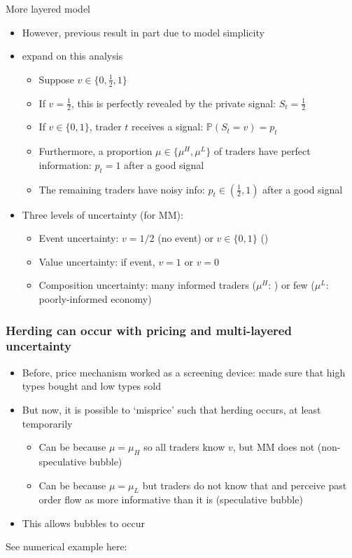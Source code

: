 \documentclass[english,10pt
,aspectratio=169
]{beamer}
\begin{document}
\begin{frame}{More layered model}
	\begin{itemize}
		\item However, previous result in part due to model simplicity
		\item \cite{avery_multidimensional_1998} expand on this analysis
		\begin{itemize}
			\item Suppose $v \in \{0,\frac{1}{2},1\}$
			\item If $v=\frac{1}{2}$, this is perfectly revealed by the private signal: $S_{t}=\frac{1}{2}$
			\item If $v \in \{0,1\}$, trader $t$ receives a signal: $\mathbb{P}(S_{t}=v)=p_{t}$
			\item Furthermore, a proportion $\mu \in \{\mu^{H}, \mu^{L}\}$ of traders have perfect information: $p_{t}=1$ after a good signal
			\item The remaining traders have noisy info: $p_{t} \in (\frac{1}{2},1)$ after a good signal
		\end{itemize}
		\pause
		\item Three levels of uncertainty (for MM): 
		\begin{itemize}
			\item Event uncertainty: $v=1/2$ (\alert{no event}) or $v \in \{0,1\}$ ()
			\item Value uncertainty: if event, $v=1$ or $v=0$
			\item Composition uncertainty: many informed traders ($\mu^{H}$: ) or few ($\mu^{L}$: \alert{poorly-informed economy})
		\end{itemize}
	\end{itemize}
\end{frame}


\begin{frame}[label=az]
	\frametitle{Herding can occur with pricing and multi-layered uncertainty}
	\begin{itemize}
		\item Before, price mechanism worked as a screening device: made sure that high types bought and low types sold
		\item But now, it is possible to `misprice' such that herding occurs, at least temporarily
		\begin{itemize}
			\item Can be because $\mu = \mu_H$ so all traders know $v$, but MM does not (non-speculative bubble)
			\item Can be because $\mu = \mu_L$ but traders do not know that and perceive past order flow as more informative than it is (speculative bubble)
		\end{itemize}
		\item This allows bubbles to occur
	\end{itemize}
	See numerical example here: \hyperlink{layers}{}
\end{frame}
\end{document}
